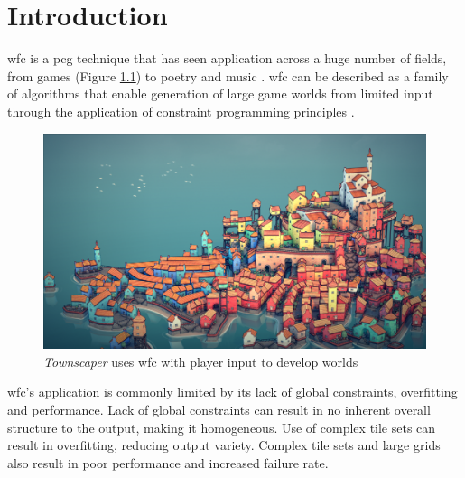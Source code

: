 \chapter{Introduction} %
\acrfull{wfc} \cite{Gumin_Wave_Function_Collapse_2016} is a \acrfull{pcg} technique that has seen application across a huge number of fields, from games \cite{townscaper,badnorth,cavesofqud} (Figure \ref{fig:townscaper}) to poetry \cite{WFC_poetry} and music \cite{WFC_music,WFC_music_2}. \acrshort{wfc} can be described as a family of algorithms that enable generation of large game worlds from limited input through the application of constraint programming principles \cite{WFC_ConstraintSolving_and_ML}.

\begin{figure}[H]
    \centering
    \includegraphics[width=\textwidth, height=0.3\textheight, keepaspectratio]{Images/Townscaper.png}
    \caption{\textit{Townscaper} uses \acrshort{wfc} with player input to develop worlds \cite{townscaper}}
    \label{fig:townscaper}
\end{figure}

\acrshort{wfc}'s application is commonly limited by its lack of global constraints, overfitting and performance. Lack of global constraints can result in no inherent overall structure to the output, making it homogeneous. Use of complex tile sets can result in overfitting, reducing output variety. Complex tile sets and large grids also result in poor performance and increased failure rate.

